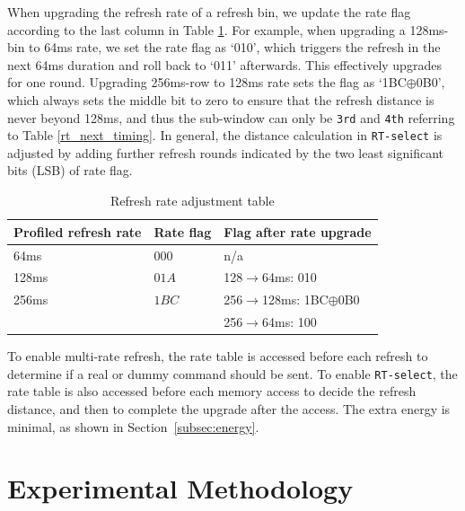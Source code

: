 When upgrading the refresh rate of a refresh bin, we update the rate flag according to the last column in Table \ref{tab:flag}. For example, when upgrading a 128ms-bin to 64ms rate, we set the rate flag as `010', which triggers the refresh in the next 64ms duration and roll back to `011' afterwards. This effectively upgrades for one round. Upgrading 256ms-row to 128ms rate sets the flag as `1BC$\oplus$0B0', which always sets the middle bit to zero to ensure that the refresh distance is never beyond 128ms, and thus the sub-window can only be {\tt 3rd} and {\tt 4th} referring to Table \ref{rt_next_timing}. In general, the distance calculation in {\tt RT-select} is adjusted by adding further refresh rounds indicated by the two least significant bits (LSB) of rate flag.

 \begin{table}[htbp]
 \vspace{-0.25in}
\caption{Refresh rate adjustment table}
\vspace{-0.3in}
\begin{center}
\scalebox{0.8}
{
\begin{tabular}{l|l|l}
\hline \hline 
{Profiled refresh rate}	&{Rate flag}	&{Flag after rate upgrade}\\
\hline\hline
64ms		&$000$	& n/a\\
\hline
128ms		&$01A$	&128$\rightarrow$64ms: 010\\
\hline
256ms		&$1BC$	&256$\rightarrow$128ms: 1BC$\oplus$0B0\\
			&		&256$\rightarrow$64ms: 100\\
\hline\hline
\end{tabular}
}
\end{center}
\label{tab:flag}
\end{table}

To enable multi-rate refresh, the %
rate table is accessed before each refresh to determine if a real or dummy command should be sent. To enable {\tt RT-select}, the rate table is also 
accessed before each memory access to decide the refresh distance, and then to complete the upgrade after the access.
The extra energy is minimal, as shown in Section~\ref{subsec:energy}.

\section{Experimental Methodology}\label{sec:experiment}
